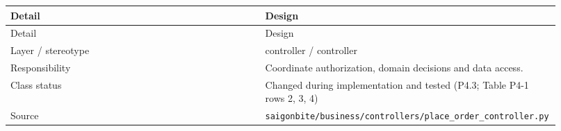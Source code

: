 \begin{longtable}{>{\raggedright\arraybackslash}p{0.4600\linewidth}>{\raggedright\arraybackslash}p{0.4600\linewidth}}
Detail & Design \\
\hline\endfirsthead
Detail & Design \\
\hline\endhead
Layer / stereotype & controller / \guillemotleft{}controller\guillemotright{} \\
Responsibility & Coordinate authorization, domain decisions and data access. \\
Class status & Changed during implementation and tested (P4.3; Table P4-1 rows 2, 3, 4) \\
Source & \texttt{saigonbite/\allowbreak{}business/\allowbreak{}controllers/\allowbreak{}place\_\allowbreak{}order\_\allowbreak{}controller.\allowbreak{}py} \\
\end{longtable}
